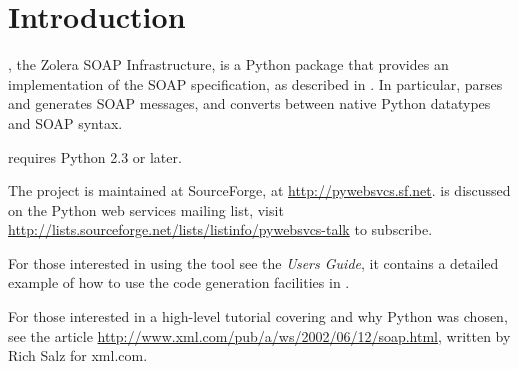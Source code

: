 \chapter{Introduction}

\ZSI{}, the Zolera SOAP Infrastructure, is a Python package that
provides an implementation of the SOAP specification, as described in
.
In particular, \ZSI{} parses and generates SOAP messages, and
converts between native Python datatypes and SOAP syntax.

 requires Python 2.3 or later.

The  project is maintained at SourceForge, at
\url{http://pywebsvcs.sf.net}.
\ZSI{} is discussed on the Python web services mailing list, visit
\url{http://lists.sourceforge.net/lists/listinfo/pywebsvcs-talk}
to subscribe.

For those interested in using the  tool see the \emph{Users
Guide}, it contains a detailed example of how to use the code generation
facilities in .

For those interested in a high-level tutorial covering \ZSI{} and why
Python was chosen, see the article
\url{http://www.xml.com/pub/a/ws/2002/06/12/soap.html}, 
written by Rich Salz for xml.com.

